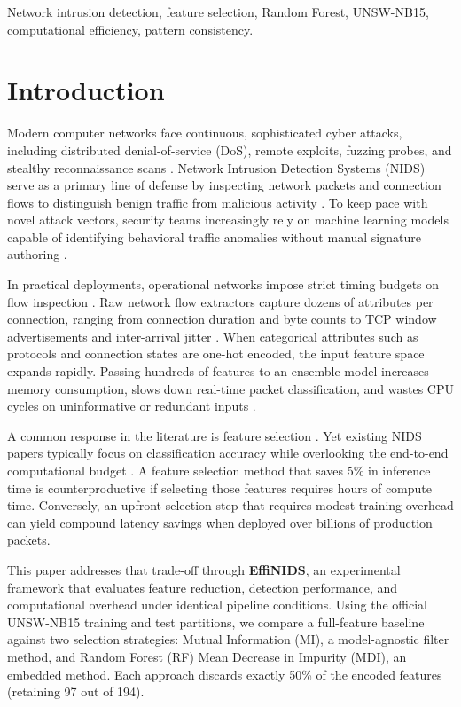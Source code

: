 \documentclass[conference]{IEEEtran}
\begin{document}
\begin{IEEEkeywords}
Network intrusion detection, feature selection, Random Forest, UNSW-NB15, computational efficiency, pattern consistency.
\end{IEEEkeywords}

\section{Introduction}
Modern computer networks face continuous, sophisticated cyber attacks, including distributed denial-of-service (DoS), remote exploits, fuzzing probes, and stealthy reconnaissance scans \cite{moustafa2015unsw}. Network Intrusion Detection Systems (NIDS) serve as a primary line of defense by inspecting network packets and connection flows to distinguish benign traffic from malicious activity \cite{ahmad2021network}. To keep pace with novel attack vectors, security teams increasingly rely on machine learning models capable of identifying behavioral traffic anomalies without manual signature authoring \cite{thakkar2022review}.

In practical deployments, operational networks impose strict timing budgets on flow inspection \cite{sarhan2022towards}. Raw network flow extractors capture dozens of attributes per connection, ranging from connection duration and byte counts to TCP window advertisements and inter-arrival jitter \cite{moustafa2016evaluation}. When categorical attributes such as protocols and connection states are one-hot encoded, the input feature space expands rapidly. Passing hundreds of features to an ensemble model increases memory consumption, slows down real-time packet classification, and wastes CPU cycles on uninformative or redundant inputs \cite{janarthanan2017feature}.

A common response in the literature is feature selection \cite{guyon2003introduction}. Yet existing NIDS papers typically focus on classification accuracy while overlooking the end-to-end computational budget \cite{kasongo2020performance}. A feature selection method that saves 5\% in inference time is counterproductive if selecting those features requires hours of compute time. Conversely, an upfront selection step that requires modest training overhead can yield compound latency savings when deployed over billions of production packets.

This paper addresses that trade-off through \textbf{EffiNIDS}, an experimental framework that evaluates feature reduction, detection performance, and computational overhead under identical pipeline conditions. Using the official UNSW-NB15 training and test partitions, we compare a full-feature baseline against two selection strategies: Mutual Information (MI), a model-agnostic filter method, and Random Forest (RF) Mean Decrease in Impurity (MDI), an embedded method. Each approach discards exactly 50\% of the encoded features (retaining 97 out of 194).
\end{document}
